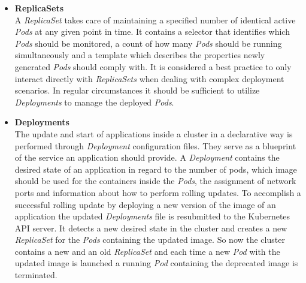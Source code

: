 \begin{itemize}
{\begin{itemize}
{        This probe should be used if an application has a strong dependency on a external back-end service to prevent information loss.
        }
    \end{itemize}
    If the \textit{Startup} and \textit{Liveness} probes fail Kubernetes autonomously terminates the \textit{Pod} and launches a new one.
    The termination happens gracefully since \textit{Pods} are distributed processes running distributed within a cluster.
    Abruptly killing processes without a cleanup phase can leave corrupted data and open database connections behind.
    To prevent those undesirable residuals, clean up commands can be passed through a specified \textit{postStop} hook.
    It is executed after the termination signal reached the \textit{Pod} and before the \texttt{TERM} signal is passed to the process with the id $1$ inside each container.
    }
    \item[]{\textbf{ReplicaSets}\\
    A \textit{ReplicaSet} takes care of maintaining a specified number of identical active \textit{Pods} at any given point in time.
    It contains a selector that identifies which \textit{Pods} should be monitored, a count of how many \textit{Pods} should be running simultaneously and a template which describes the properties newly generated \textit{Pods} should comply with.
    It is considered a best practice to only interact directly with \textit{ReplicaSets} when dealing with complex deployment scenarios.
    In regular circumstances it should be sufficient to utilize \textit{Deployments} to manage the deployed \textit{Pods}.
    }
    \item[]{\textbf{Deployments}\\
    The update and start of applications inside a cluster in a declarative way is performed through \textit{Deployment} configuration files.
    They serve as a blueprint of the service an application should provide.
    A \textit{Deployment} contains the desired state of an application in regard to the number of pods, which image should be used for the containers inside the \textit{Pods}, the assignment of network ports and information about how to perform rolling updates.
    To accomplish a successful rolling update by deploying a new version of the image of an application the updated \textit{Deployments} file is resubmitted to the Kubernetes API server.
    It detects a new desired state in the cluster and creates a new \textit{ReplicaSet} for the \textit{Pods} containing the updated image.
    So now the cluster contains a new and an old \textit{ReplicaSet} and each time a new \textit{Pod} with the updated image is launched a running \textit{Pod} containing the deprecated image is terminated.
}
\end{itemize}
